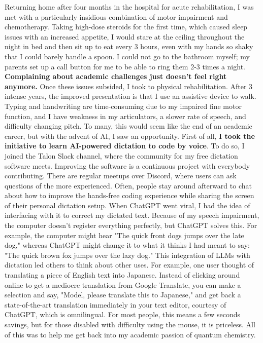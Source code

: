 \documentclass[11pt]{article} %
\begin{document}
Returning home after four months in the hospital for acute rehabilitation, I was met with a particularly insidious combination of motor impairment and chemotherapy. Taking high-dose steroids for the first time, which caused sleep issues with an increased appetite, I would stare at the ceiling throughout the night in bed and then sit up to eat every 3 hours, even with my hands so shaky that I could barely handle a spoon. I could not go to the bathroom myself; my parents set up a call button for me to be able to ring them 2-3 times a night. \textbf{Complaining about academic challenges just doesn't feel right anymore.} Once these issues subsided, I took to physical rehabilitation. After 3 intense years, the improved presentation is that I use an assistive device to walk. Typing and handwriting are time-consuming due to my impaired fine motor function, and I have weakness in my articulators, a slower rate of speech, and difficulty changing pitch. To many, this would seem like the end of an academic career, but with the advent of AI, I saw an opportunity. First of all, \textbf{I took the initiative to learn AI-powered dictation to code by voice}. To do so, I joined the Talon Slack channel, where the community for my free dictation software meets. Improving the software is a continuous project with everybody contributing. There are regular meetups over Discord, where users can ask questions of the more experienced. Often, people stay around afterward to chat about how to improve the hands-free coding experience while sharing the screen of their personal dictation setup. When ChatGPT went viral, I had the idea of interfacing with it to correct my dictated text. Because of my speech impairment, the computer doesn't register everything perfectly, but ChatGPT solves this. For example, the computer might hear "The quick front dogs jumps over the late dog," whereas ChatGPT might change it to what it thinks I had meant to say: "The quick brown fox jumps over the lazy dog." This integration of LLMs with dictation led others to think about other uses. For example, one user thought of translating a piece of English text into Japanese. Instead of clicking around online to get a mediocre translation from Google Translate, you can make a selection and say, "Model, please translate this to Japanese," and get back a state-of-the-art translation immediately in your text editor, courtesy of ChatGPT, which is omnilingual. For most people, this means a few seconds savings, but for those disabled with difficulty using the mouse, it is priceless. All of this was to help me get back into my academic passion of quantum chemistry.
\end{document}
